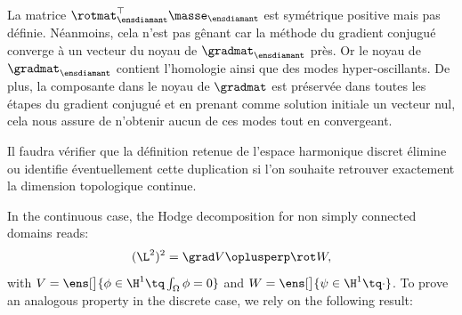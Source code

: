 \begin{prop}
\end{prop}

\begin{remarque}
La matrice $\rotmat^\top_\ensdiamant \masse_\ensdiamant$ est symétrique positive mais pas définie. Néanmoins, cela n'est pas gênant car la méthode du gradient conjugué converge à un vecteur du noyau de $\gradmat_\ensdiamant$ près. Or le noyau de $\gradmat_\ensdiamant$ contient l'homologie ainsi que des modes hyper-oscillants. De plus, la composante dans le noyau de $\gradmat$ est préservée dans toutes les étapes du gradient conjugué et en prenant comme solution initiale un vecteur nul, cela nous assure de n'obtenir aucun de ces modes tout en convergeant. 
\end{remarque}

Il faudra vérifier que la définition retenue de l'espace harmonique
discret élimine ou identifie éventuellement cette duplication si l'on
souhaite retrouver exactement la dimension topologique continue.


\cite[Sec. 4.3]{delcourte_discrete_2007} In the continuous case, the Hodge decomposition for non simply connected domains reads:
\begin{equation} \label{eq:413}
(\L^2)^2 = \grad V \oplusperp \rot W,
\end{equation}
with $V = \ens[\big]{\phi \in \H^1 \tq \int_\Omega \phi = 0}$ and $W = \ens[\big]{\psi \in \H^1 \tq \cdot}$. To prove an analogous property in the discrete case, we rely on the following result:


